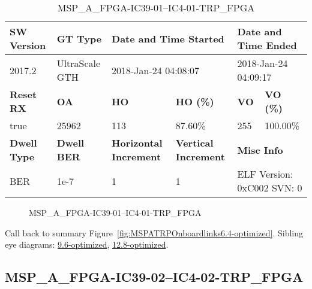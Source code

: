 \begin{table}[h]
\centering
\caption{MSP\_A\_FPGA-IC39-01--IC4-01-TRP\_FPGA}
\label{tab:MSPAFPGAIC3901IC401TRPFPGA6.4-optimized}
\begin{tabular}{@{}|l|l|l|l|l|l|@{}}
\toprule
\textbf{SW Version}                & \textbf{GT Type}   & \multicolumn{2}{l|}{\textbf{Date and Time Started}}            & \multicolumn{2}{l|}{\textbf{Date and Time Ended}}        \\ \midrule
2017.2                       & UltraScale GTH          & \multicolumn{2}{l|}{2018-Jan-24 04:08:07}                   & \multicolumn{2}{l|}{2018-Jan-24 04:09:17}               \\ \midrule
\textbf{Reset RX}                  & \textbf{OA} & \textbf{HO}   & \textbf{HO (\%)} & \textbf{VO} & \textbf{VO (\%)} \\ \midrule
true & 25962        & 113          & 87.60\%        & 255        & 100.00\%       \\ \midrule
\textbf{Dwell Type}                & \textbf{Dwell BER} & \textbf{Horizontal Increment} & \textbf{Vertical Increment}    & \multicolumn{2}{l|}{\textbf{Misc Info}}                  \\ \midrule
BER                            & 1e-7        & 1        & 1           & \multicolumn{2}{l|}{ELF Version: 0xC002 SVN: 0}                         \\ \bottomrule
\end{tabular}
\end{table}

\begin{figure}[h]
\caption{MSP\_A\_FPGA-IC39-01--IC4-01-TRP\_FPGA} \label{fig:MSPAFPGAIC3901IC401TRPFPGA6.4-optimized}
\end{figure}

Call back to summary Figure~\ref{fig:MSPATRPOnboardlinks6.4-optimized}.
Sibling eye diagrams: \hyperref[sec:MSPAFPGAIC3901IC401TRPFPGA9.6-optimized]{9.6-optimized}, \hyperref[sec:MSPAFPGAIC3901IC401TRPFPGA12.8-optimized]{12.8-optimized}.

\clearpage
\newpage


\subsection{MSP\_A\_FPGA-IC39-02--IC4-02-TRP\_FPGA}\label{sec:MSPAFPGAIC3902IC402TRPFPGA6.4-optimized}

